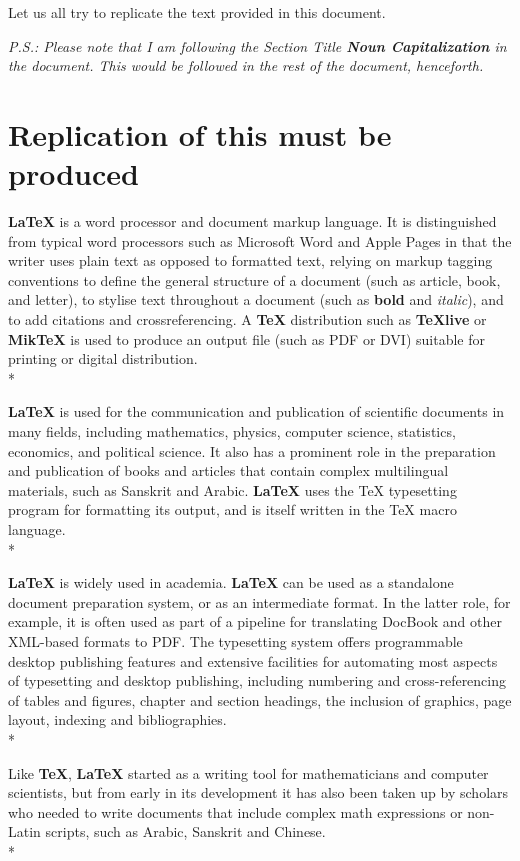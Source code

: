 \documentclass[12pt, a4paper]{article}
\begin{document}
Let us all try to replicate the text provided in this document.

\textit{P.S.: Please note that I am following the Section Title \textbf{Noun Capitalization} in the document. This would be followed in the rest of the
document, henceforth.}

\clearpage

\section{Replication of this must be produced}
\textbf{LaTeX} is a word processor and document markup language. It is distinguished from typical word processors such as Microsoft Word and
Apple Pages in that the writer uses plain text as opposed to formatted text, relying on markup tagging conventions to define the general
structure of a document (such as article, book, and letter), to stylise
text throughout a document (such as \textbf{bold} and \textit{italic}), and to add citations and 
crossreferencing. A \textbf{TeX} distribution such as \textbf{TeXlive} or
\textbf{MikTeX} is used to produce an output file (such as PDF or DVI) suitable
for printing or digital distribution.
\\*

\textbf{LaTeX} is used for the communication and publication of scientific
documents in many fields, including mathematics, physics, computer
science, statistics, economics, and political science. It also has a prominent role in the preparation and publication of books and articles that
contain complex multilingual materials, such as Sanskrit and Arabic. 
\textbf{LaTeX} uses the TeX typesetting program for formatting its output, and
is itself written in the TeX macro language.
\\*

\textbf{LaTeX} is widely used in academia. \textbf{LaTeX} can be used as a standalone document preparation system, or as an intermediate format. In
the latter role, for example, it is often used as part of a pipeline for
translating DocBook and other XML-based formats to PDF. The typesetting system offers programmable desktop publishing features and
extensive facilities for automating most aspects of typesetting and desktop publishing, including numbering and cross-referencing of tables
and figures, chapter and section headings, the inclusion of graphics,
page layout, indexing and bibliographies.
\\*

Like \textbf{TeX}, \textbf{LaTeX} started as a writing tool for mathematicians and
computer scientists, but from early in its development it has also been
taken up by scholars who needed to write documents that include complex math expressions or non-Latin scripts, such as Arabic, Sanskrit and Chinese.
\\*
\end{document}
